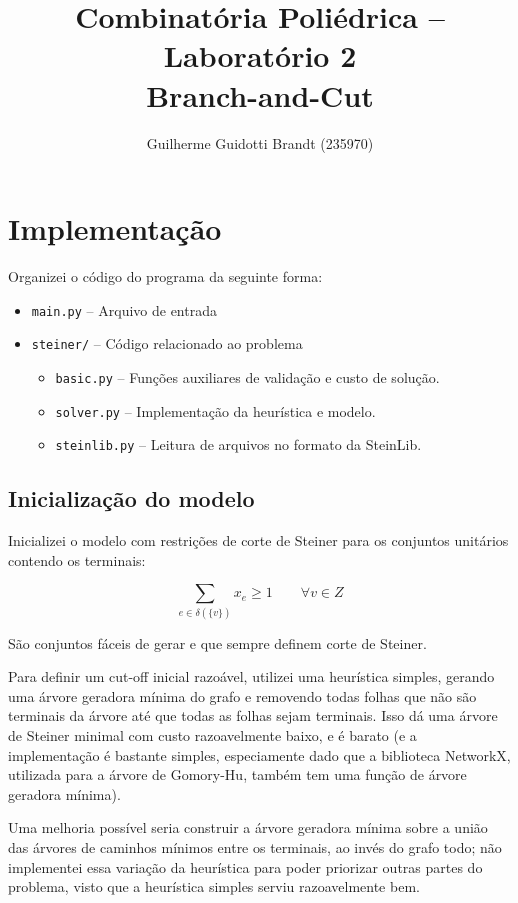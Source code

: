 \documentclass{article}
\title{Combinatória Poliédrica -- Laboratório 2\\Branch-and-Cut}
\author{Guilherme Guidotti Brandt (235970)}
\date{}
\begin{document}
\maketitle

\section{Implementação}

Organizei o código do programa da seguinte forma:
\begin{itemize}
    \item {\tt main.py} -- Arquivo de entrada
    \item {\tt steiner/} -- Código relacionado ao problema
          \begin{itemize}
              \item {\tt basic.py} -- Funções auxiliares de validação e custo de solução.
              \item {\tt solver.py} -- Implementação da heurística e modelo.
              \item {\tt steinlib.py} -- Leitura de arquivos no formato da SteinLib.
          \end{itemize}
\end{itemize}

\subsection{Inicialização do modelo}

Inicializei o modelo com restrições de corte de Steiner para os conjuntos unitários contendo os terminais:

$$\sum_{e \in \delta(\{v\})} x_e \geq 1 \qquad \forall v \in Z$$

São conjuntos fáceis de gerar e que sempre definem corte de Steiner.

Para definir um cut-off inicial razoável, utilizei uma heurística simples,
gerando uma árvore geradora mínima do grafo e removendo todas folhas que não
são terminais da árvore até que todas as folhas sejam terminais. Isso dá uma
árvore de Steiner minimal com custo  razoavelmente baixo, e é barato (e a
implementação é bastante simples, especiamente dado que a biblioteca NetworkX, utilizada
para a árvore de Gomory-Hu, também tem uma função de árvore geradora mínima).

Uma melhoria possível seria construir a árvore geradora mínima sobre a união
das árvores de caminhos mínimos entre os terminais, ao invés do grafo todo;
não implementei essa variação da heurística para poder priorizar outras
partes do problema, visto que a heurística simples serviu razoavelmente bem.
\end{document}
